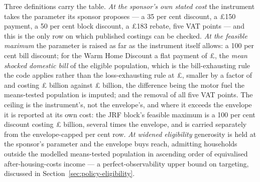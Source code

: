 Three definitions carry the table. \emph{At the sponsor's own stated cost} the instrument takes the parameter its sponsor proposes --- a 35 per cent discount, a \pounds 150 payment, a 50 per cent block discount, a \pounds 183 rebate, five VAT points --- and this is the only row on which published costings can be checked. \emph{At the feasible maximum} the parameter is raised as far as the instrument itself allows: a 100 per cent bill discount; for the Warm Home Discount a flat payment of \pounds \genWhdCeilingBillRuleGbp{}, the \emph{mean shocked domestic bill} of the eligible population, which is the bill-exhausting rule the code applies rather than the loss-exhausting rule at \pounds \genWhdCeilingLossRuleGbp{}, smaller by a factor of \genWhdCeilingRuleRatio{} and costing \pounds \genWhdCeilingLossRuleCostBn{} billion against \pounds \genWhdCeilingBillRuleCostBn{} billion, the difference being the motor fuel the means-tested population is imputed; and the removal of all five VAT points. The ceiling is the instrument's, not the envelope's, and where it exceeds the envelope it is reported at its own cost: the JRF block's feasible maximum is a 100 per cent discount costing \pounds \genJrfFeasibleMaxCostBn{} billion, several times the envelope, and is carried separately from the envelope-capped \genJrfCappedParameterPct{} per cent row. \emph{At widened eligibility} generosity is held at the sponsor's parameter and the envelope buys reach, admitting households outside the modelled means-tested population in ascending order of equivalised after-housing-costs income --- a perfect-observability upper bound on targeting, discussed in Section~\ref{sec:policy-eligibility}.

